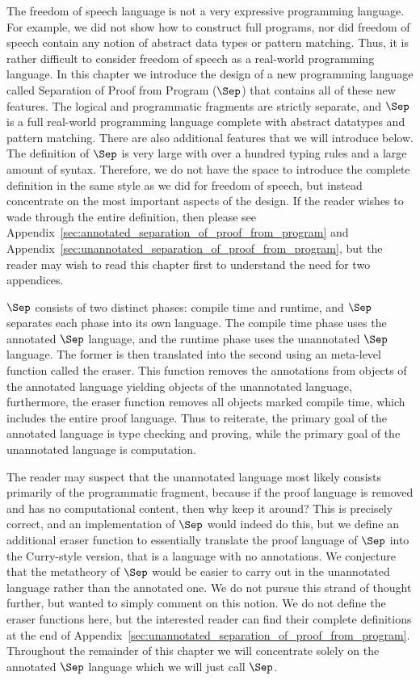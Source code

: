 The freedom of speech language is not a very expressive programming
language.  For example, we did not show how to construct full
programs, nor did freedom of speech contain any notion of abstract
data types or pattern matching.  Thus, it is rather difficult to
consider freedom of speech as a real-world programming language.  In
this chapter we introduce the design of a new programming language
called Separation of Proof from Program ($\Sep$) that contains all of
these new features.  The logical and programmatic fragments are
strictly separate, and $\Sep$ is a full real-world programming
language complete with abstract datatypes and pattern matching.  There
are also additional features that we will introduce below.  The
definition of $\Sep$ is very large with over a hundred typing rules
and a large amount of syntax.  Therefore, we do not have the space to
introduce the complete definition in the same style as we did for
freedom of speech, but instead concentrate on the most important
aspects of the design.  If the reader wishes to wade through the
entire definition, then please see
Appendix~\ref{sec:annotated_separation_of_proof_from_program} and
Appendix~\ref{sec:unannotated_separation_of_proof_from_program}, but
the reader may wish to read this chapter first to understand the need
for two appendices.

$\Sep$ consists of two distinct phases: compile time and runtime, and
$\Sep$ separates each phase into its own language.  The compile time
phase uses the annotated $\Sep$ language, and the runtime phase uses
the unannotated $\Sep$ language.  The former is then translated into
the second using an meta-level function called the eraser.  This
function removes the annotations from objects of the annotated
language yielding objects of the unannotated language, furthermore, the
eraser function removes all objects marked compile time, which
includes the entire proof language.  Thus to reiterate, the primary
goal of the annotated language is type checking and proving, while the
primary goal of the unannotated language is computation.  

The reader may suspect that the unannotated language most likely
consists primarily of the programmatic fragment, because if the proof
language is removed and has no computational content, then why keep it
around?  This is precisely correct, and an implementation of $\Sep$
would indeed do this, but we define an additional eraser function to
essentially translate the proof language of $\Sep$ into the
Curry-style version, that is a language with no annotations.  We
conjecture that the metatheory of $\Sep$ would be easier to carry out
in the unannotated language rather than the annotated one.  We do not
pursue this strand of thought further, but wanted to simply comment on
this notion. We do not define the eraser functions here, but the
interested reader can find their complete definitions at the end of
Appendix~\ref{sec:unannotated_separation_of_proof_from_program}.
Throughout the remainder of this chapter we will concentrate solely on
the annotated $\Sep$ language which we will just call $\Sep$.

